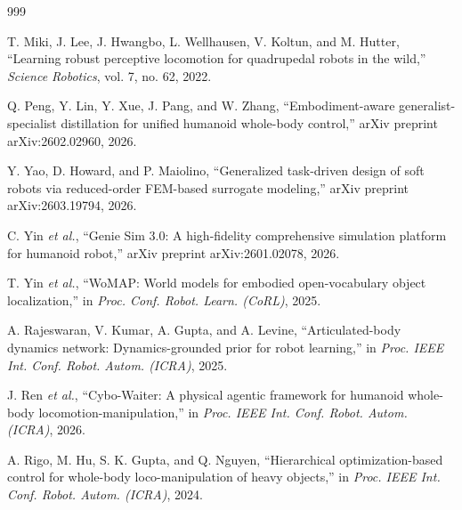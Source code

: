 \documentclass[12pt,a4paper,oneside]{report}
\begin{document}
\begin{thebibliography}{999}

T. Miki, J. Lee, J. Hwangbo, L. Wellhausen, V. Koltun, and M. Hutter, ``Learning robust perceptive locomotion for quadrupedal robots in the wild,'' \textit{Science Robotics}, vol. 7, no. 62, 2022.








Q. Peng, Y. Lin, Y. Xue, J. Pang, and W. Zhang, ``Embodiment-aware generalist-specialist distillation for unified humanoid whole-body control,'' arXiv preprint arXiv:2602.02960, 2026.








Y. Yao, D. Howard, and P. Maiolino, ``Generalized task-driven design of soft robots via reduced-order FEM-based surrogate modeling,'' arXiv preprint arXiv:2603.19794, 2026.




C. Yin \textit{et al.}, ``{Genie Sim 3.0}: A high-fidelity comprehensive simulation platform for humanoid robot,'' arXiv preprint arXiv:2601.02078, 2026.




T. Yin \textit{et al.}, ``{WoMAP}: World models for embodied open-vocabulary object localization,'' in \textit{Proc. Conf. Robot. Learn. (CoRL)}, 2025.




A. Rajeswaran, V. Kumar, A. Gupta, and A. Levine, ``Articulated-body dynamics network: Dynamics-grounded prior for robot learning,'' in \textit{Proc. IEEE Int. Conf. Robot. Autom. (ICRA)}, 2025.




J. Ren \textit{et al.}, ``Cybo-Waiter: A physical agentic framework for humanoid whole-body locomotion-manipulation,'' in \textit{Proc. IEEE Int. Conf. Robot. Autom. (ICRA)}, 2026.




A. Rigo, M. Hu, S. K. Gupta, and Q. Nguyen, ``Hierarchical optimization-based control for whole-body loco-manipulation of heavy objects,'' in \textit{Proc. IEEE Int. Conf. Robot. Autom. (ICRA)}, 2024.




\end{thebibliography}
\end{document}
